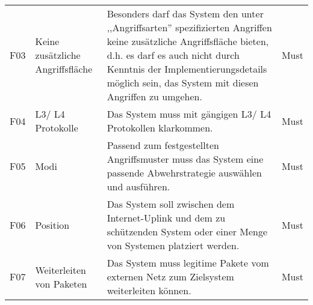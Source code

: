 \documentclass[../review_1.tex]{subfiles}
\begin{document}
\begin{longtable} [h] {p{1cm} p{4cm} p{7cm} l}
    F03                                                                                                                                                                                                              & Keine zusätzliche Angriffsfläche               & Besonders darf das System den unter ,,Angriffsarten'' spezifizierten Angriffen keine zusätzliche Angriffsfläche bieten, d.h. es darf es auch nicht durch Kenntnis der Implementierungsdetails möglich sein, das System mit diesen Angriffen zu umgehen. & Must            \\
    F04                                                                                                                                                                                                              & L3/ L4 Protokolle                              & Das System muss mit gängigen L3/ L4 Protokollen klarkommen.                                                                                                                                                                                             & Must            \\
    F05                                                                                                                                                                                                              & Modi                                           & Passend zum festgestellten Angriffsmuster muss das System eine passende Abwehrstrategie auswählen und ausführen.                                                                                                                                        & Must            \\
    F06                                                                                                                                                                                                              & Position                                       & Das System soll zwischen dem Internet-Uplink und dem zu schützenden System oder einer Menge von Systemen platziert werden.                                                                                                                              & Must            \\
    F07                                                                                                                                                                                                              & Weiterleiten von Paketen                       & Das System muss legitime Pakete vom externen Netz zum Zielsystem weiterleiten können.                                                                                                                                                                   & Must            \\

\end{longtable}
\end{document}
